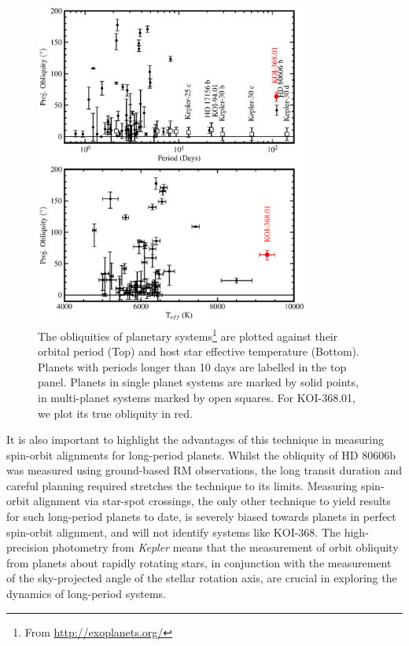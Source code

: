 \documentclass[iop]{emulateapj}
\begin{document}
\begin{figure}
  \centering
  \includegraphics[width=9cm]{period_obliq.eps}
  \caption{The obliquities of planetary systems\footnote{From \url{http://exoplanets.org/}} are plotted against their orbital period (Top) and host star effective temperature (Bottom). Planets with periods longer than 10 days are labelled in the top panel. Planets in single planet systems are marked by solid points, in multi-planet systems marked by open squares. For KOI-368.01, we plot its true obliquity in red.}
  \label{fig:periodobliq}
\end{figure}

It is also important to highlight the advantages of this technique in measuring spin-orbit alignments 
for long-period planets. Whilst the obliquity of HD 80606b was measured using ground-based RM observations, 
the long transit duration and careful planning required stretches the technique to its limits. 
Measuring spin-orbit alignment via star-spot crossings, the only other technique to yield results for 
such long-period planets to date, is severely biased towards planets in perfect spin-orbit alignment, 
and will not identify systems like KOI-368. The high-precision photometry from \emph{Kepler} means that 
the measurement of orbit obliquity from planets about rapidly rotating stars, in conjunction with the 
measurement of the sky-projected angle of the stellar rotation axis, are crucial in exploring the dynamics 
of long-period systems.



\end{document}
